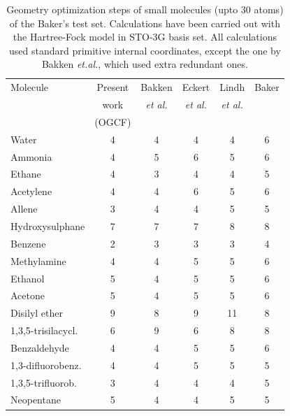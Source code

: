 \documentclass[prl,aps,twocolumn,showpacs,twocolumngrid,superbib]{revtex4}
\begin{document}
\begin{table}[h]
\caption{
Geometry optimization steps of small molecules (upto 30 atoms)
of the Baker's test set. Calculations have been carried out 
with the Hartree-Fock model in STO-3G basis set.
All calculations used standard primitive internal coordinates,
except the one by Bakken {\it et.al.}, which used extra redundant
ones.
}
\label{Bakers_test}
\begin{tabular}{lccccc}
\toprule
Molecule               & Present  & Bakken & Eckert  & Lindh &  Baker  \\
         & work & {\it{et al.}} & {\it{et al.}} & {\it{et al.}} &    \\
         &(OGCF) &  \cite{bakken} &  \cite{eckert} & \cite{lindh} &  \cite{bakerstest} \\
\colrule
Water                  &   4    &   4    &    4    &    4   &   6     \\
Ammonia                &   4    &   5    &    6    &    5   &   6     \\
Ethane                 &   4    &   3    &    4    &    4   &   5     \\
Acetylene              &   4    &   4    &    6    &    5   &   6     \\
Allene                 &   3    &   4    &    4    &    5   &   5     \\
Hydroxysulphane        &   7    &   7    &    7    &    8   &   8     \\
Benzene                &   2    &   3    &    3    &    3   &   4     \\
Methylamine            &   4    &   4    &    5    &    5   &   6     \\
Ethanol                &   5    &   4    &    5    &    5   &   6     \\
Acetone                &   5    &   4    &    5    &    5   &   6     \\
Disilyl ether          &   9    &   8    &    9    &   11   &   8     \\
1,3,5-trisilacycl.     &   6    &   9    &    6    &    8   &   8     \\
Benzaldehyde           &   4    &   4    &    5    &    5   &   6     \\
1,3-difluorobenz.      &   4    &   4    &    5    &    5   &   5     \\
1,3,5-trifluorob.      &   3    &   4    &    4    &    4   &   5     \\
Neopentane             &   5    &   4    &    4    &    5   &   5     \\

\end{tabular}
\end{table}
\end{document}
